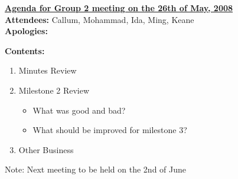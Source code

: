 \documentclass{letter}
\begin{document}
{\large \textbf{\underline{Agenda for Group 2 meeting on the 26th of May, 2008}}}\\

\textbf{Attendees:} Callum, Mohammad, Ida, Ming, Keane\\
\textbf{Apologies:}

\textbf{Contents:}

\begin{enumerate}
\item Minutes Review
\item Milestone 2 Review
	\begin{itemize}
	\item What was good and bad?
	\item What should be improved for milestone 3?
	\end{itemize}
\item Other Business
\end{enumerate}
 
Note: Next meeting to be held on the 2nd of June
\end{document}
